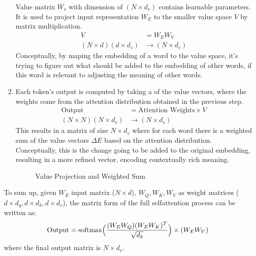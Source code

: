 \documentclass[letterpaper,11pt,english]{sphinxmanual}
\begin{document}
\begin{enumerate}
\sphinxAtStartPar
Value matrix \(W_v\) with dimension of \((N \times d_v)\)
contains learnable parameters. It is used to project input
representation \(W_E\) to the smaller value space \(V\) by
matrix multiplication.
\begin{equation*}
\begin{split}V &= W_E W_V \\
(N \times d) (d \times d_v) &\rightarrow (N \times d_v)\end{split}
\end{equation*}
\sphinxAtStartPar
Conceptually, by maping the embedding of a word to the value space,
it’s trying to figure out what should be added to the embedding of
other words, if this word is relevant to adjusting the meaning of
other words.

\item {} 
\sphinxAtStartPar
{}

\sphinxAtStartPar
Each token’s output is computed by taking a  of the
value vectors, where the weights come from the attention distribution
obtained in the previous step.
\begin{equation*}
\begin{split}\text{Output} &= \text{Attention Weights} \times V\\
(N \times N) (N \times d_v) &\rightarrow (N \times d_v)\end{split}
\end{equation*}
\sphinxAtStartPar
This results in a matrix of size \(N \times d_v\) where for each
word there is a weighted sum of the value vectors \(\Delta E\)
based on the attention distribution. Conceptually, this is the change
going to be added to the original embedding, resulting in a more
refined vector, encoding contextually rich meaning.

\begin{figure}[htbp]
\centering
\capstart

\noindent{}
\caption{Value Projection and Weighted Sum}\label{\detokenize{pretraining:id17}}\end{figure}

\end{enumerate}

\sphinxAtStartPar
To sum up, given \(W_E\) input matrix (\(N \times d\)),
\(W_Q, W_K, W_V\) as weight matrices
(\(d\times d_q, d\times d_k, d\times d_v\)), the matrix form of the
full self\sphinxhyphen{}attention process can be written as:
\begin{equation*}
\begin{split}\text{Output} = \text{softmax}\Big({(W_EW_Q)(W_EW_K)^T \over \sqrt{d_k}}\Big) \times (W_EW_V)\end{split}
\end{equation*}
\sphinxAtStartPar
where the final output matrix is \(N \times d_v\).
\end{document}
